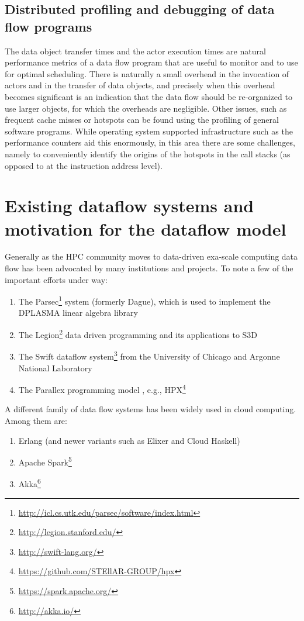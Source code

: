 \documentclass[11pt,a4paper]{article}
\begin{document}
\subsection{Distributed profiling and debugging of data flow programs}

The data object transfer times and the actor execution times are
natural performance metrics of a data flow program that are useful to
monitor and to use for optimal scheduling.  There is naturally a small
overhead in the invocation of actors and in the transfer of data
objects, and precisely when this overhead becomes significant is an
indication that the data flow should be re-organized to use larger
objects, for which the overheads are negligible.  Other issues, such
as frequent cache misses or hotspots can be found using the profiling
of general software programs.  While operating system supported
infrastructure such as the performance counters aid this enormously,
in this area there are some challenges, namely to conveniently
identify the origins of the hotspots in the call stacks (as opposed to
at the instruction address level).

\section{Existing dataflow systems and motivation for the dataflow model}

Generally as the HPC community moves to data-driven exa-scale
computing data flow has been advocated by many institutions and
projects.  To note a few of the important efforts under way:

\begin{enumerate}
\item The
  Parsec\footnote{\url{http://icl.cs.utk.edu/parsec/software/index.html} }
  system (formerly Dague), which is used to implement the DPLASMA
  linear algebra library
 \item The Legion\footnote{\url{http://legion.stanford.edu/}{} } data
   driven programming and its applications to S3D
 \item The Swift dataflow system\footnote{\url{http://swift-lang.org/}
   } from the University of Chicago and Argonne National Laboratory
 \item The Parallex programming model \citep{Kaiser5364511}, e.g.,
   HPX\footnote{\url{https://github.com/STEllAR-GROUP/hpx} }
\end{enumerate}

A different family of data flow systems has been widely used in cloud
computing.  Among them are:
\begin{enumerate}
  \item Erlang (and newer variants such as Elixer and Cloud Haskell)
  \item Apache Spark\footnote{\url{https://spark.apache.org/} }
  \item Akka\footnote{\url{http://akka.io/} }
\end{enumerate}
\end{document}
